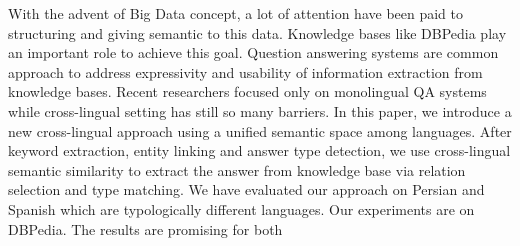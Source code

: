 With the advent of Big Data concept, a lot of attention have been paid to structuring and giving semantic to this data. Knowledge bases like DBPedia play an important role to achieve this goal. Question answering systems are common approach to address expressivity and usability of information extraction from knowledge bases. Recent researchers focused only on monolingual QA systems while cross-lingual setting has still so many barriers. In this paper, we introduce a new cross-lingual approach using a unified semantic space among languages. After keyword extraction, entity linking and answer type detection, we use cross-lingual semantic similarity to extract the answer from knowledge base via relation selection and type matching. We have evaluated our approach on Persian and Spanish which are typologically different languages. Our experiments are on DBPedia. The results are promising for both

